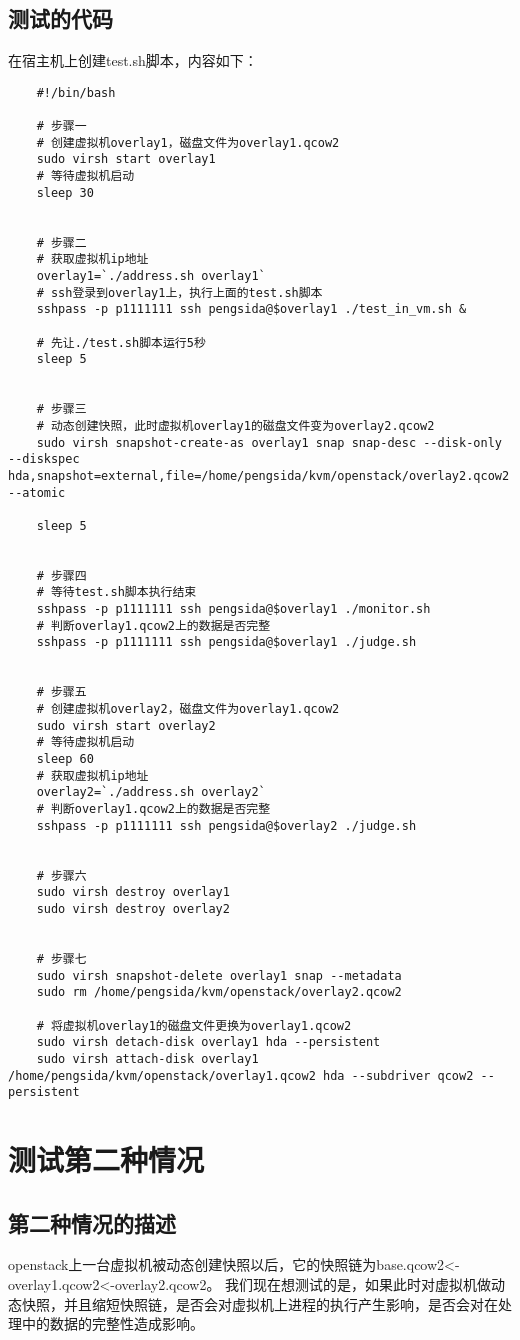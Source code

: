 \documentclass[a4paper,left=1.5cm,right=1.5cm,11pt]{article}
\begin{document}
\subsection{测试的代码}
	在宿主机上创建test.sh脚本，内容如下：
	\begin{lstlisting}
	#!/bin/bash

	# 步骤一
	# 创建虚拟机overlay1，磁盘文件为overlay1.qcow2
	sudo virsh start overlay1
	# 等待虚拟机启动
	sleep 30


	# 步骤二
	# 获取虚拟机ip地址
	overlay1=`./address.sh overlay1`
	# ssh登录到overlay1上，执行上面的test.sh脚本
	sshpass -p p1111111 ssh pengsida@$overlay1 ./test_in_vm.sh &

	# 先让./test.sh脚本运行5秒
	sleep 5


	# 步骤三
	# 动态创建快照，此时虚拟机overlay1的磁盘文件变为overlay2.qcow2
	sudo virsh snapshot-create-as overlay1 snap snap-desc --disk-only --diskspec hda,snapshot=external,file=/home/pengsida/kvm/openstack/overlay2.qcow2 --atomic

	sleep 5


	# 步骤四
	# 等待test.sh脚本执行结束
	sshpass -p p1111111 ssh pengsida@$overlay1 ./monitor.sh
	# 判断overlay1.qcow2上的数据是否完整
	sshpass -p p1111111 ssh pengsida@$overlay1 ./judge.sh


	# 步骤五
	# 创建虚拟机overlay2，磁盘文件为overlay1.qcow2
	sudo virsh start overlay2
	# 等待虚拟机启动
	sleep 60
	# 获取虚拟机ip地址
	overlay2=`./address.sh overlay2`
	# 判断overlay1.qcow2上的数据是否完整
	sshpass -p p1111111 ssh pengsida@$overlay2 ./judge.sh


	# 步骤六
	sudo virsh destroy overlay1
	sudo virsh destroy overlay2


	# 步骤七
	sudo virsh snapshot-delete overlay1 snap --metadata
	sudo rm /home/pengsida/kvm/openstack/overlay2.qcow2

	# 将虚拟机overlay1的磁盘文件更换为overlay1.qcow2
	sudo virsh detach-disk overlay1 hda --persistent
	sudo virsh attach-disk overlay1 /home/pengsida/kvm/openstack/overlay1.qcow2 hda --subdriver qcow2 --persistent
	\end{lstlisting}

\section{测试第二种情况}
\subsection{第二种情况的描述}
	openstack上一台虚拟机被动态创建快照以后，它的快照链为base.qcow2<-overlay1.qcow2<-overlay2.qcow2。
	我们现在想测试的是，如果此时对虚拟机做动态快照，并且缩短快照链，是否会对虚拟机上进程的执行产生影响，是否会对在处理中的数据的完整性造成影响。\par
\end{document}

